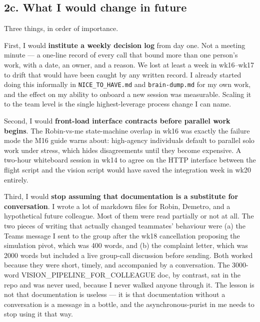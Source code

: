 \subsection*{2c. What I would change in future}

Three things, in order of importance.

First, I would \textbf{institute a weekly decision log} from day one. Not a meeting minute --- a one-line record of every call that bound more than one person's work, with a date, an owner, and a reason. We lost at least a week in wk16--wk17 to drift that would have been caught by any written record. I already started doing this informally in \texttt{NICE\_TO\_HAVE.md} and \texttt{brain-dump.md} for my own work, and the effect on my ability to onboard a new session was measurable. Scaling it to the team level is the single highest-leverage process change I can name.

Second, I would \textbf{front-load interface contracts before parallel work begins}. The Robin-vs-me state-machine overlap in wk16 was exactly the failure mode the M16 guide warns about: high-agency individuals default to parallel solo work under stress, which hides disagreements until they become expensive. A two-hour whiteboard session in wk14 to agree on the HTTP interface between the flight script and the vision script would have saved the integration week in wk20 entirely.

Third, I would \textbf{stop assuming that documentation is a substitute for conversation}. I wrote a lot of markdown files for Robin, Demetro, and a hypothetical future colleague. Most of them were read partially or not at all. The two pieces of writing that actually changed teammates' behaviour were (a) the Teams message I sent to the group after the wk18 cancellation proposing the simulation pivot, which was 400 words, and (b) the complaint letter, which was 2000 words but included a live group-call discussion before sending. Both worked because they were short, timely, and accompanied by a conversation. The 3000-word VISION\_PIPELINE\_FOR\_COLLEAGUE doc, by contrast, sat in the repo and was never used, because I never walked anyone through it. The lesson is not that documentation is useless --- it is that documentation without a conversation is a message in a bottle, and the asynchronous-purist in me needs to stop using it that way.
